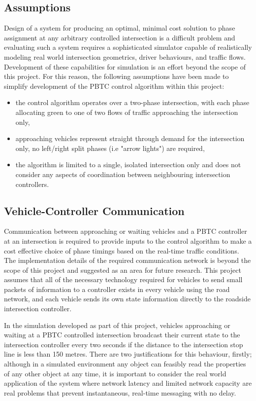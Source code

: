 \subsection{Assumptions}

Design of a system for producing an optimal, minimal cost solution to phase assignment at any arbitrary controlled intersection is a difficult problem and evaluating such a system requires a sophisticated simulator capable of realistically modeling real world intersection geometrics, driver behaviours, and traffic flows. Development of these capabilities for simulation is an effort beyond the scope of this project. For this reason, the following assumptions have been made to simplify development of the PBTC control algorithm within this project:

\begin{itemize}
\item the control algorithm operates over a two-phase intersection, with each phase allocating green to one of two flows of traffic approaching the intersection only,
\item approaching vehicles represent straight through demand for the intersection only, no left/right split phases (i.e "arrow lights") are required,
\item the algorithm is limited to a single, isolated intersection only and does not consider any aspects of coordination between neighbouring intersection controllers.
\end{itemize}

\subsection{Vehicle-Controller Communication}

Communication between approaching or waiting vehicles and a PBTC controller at an intersection is required to provide inputs to the control algorithm to make a cost effective choice of phase timings based on the real-time traffic conditions. The implementation details of the required communication network is beyond the scope of this project and suggested as an area for future research. This project assumes that all of the necessary technology required for vehicles to send small packets of information to a controller exists in every vehicle using the road network, and each vehicle sends its own state information directly to the roadside intersection controller.

In the simulation developed as part of this project, vehicles approaching or waiting at a PBTC controlled intersection broadcast their current state to the intersection controller every two seconds if the distance to the intersection stop line is less than 150 metres. There are two justifications for this behaviour, firstly; although in a simulated environment any object can feasibly read the properties of any other object at any time, it is important to consider the real world application of the system where network latency and limited network capacity are real problems that prevent instantaneous, real-time messaging with no delay. 

